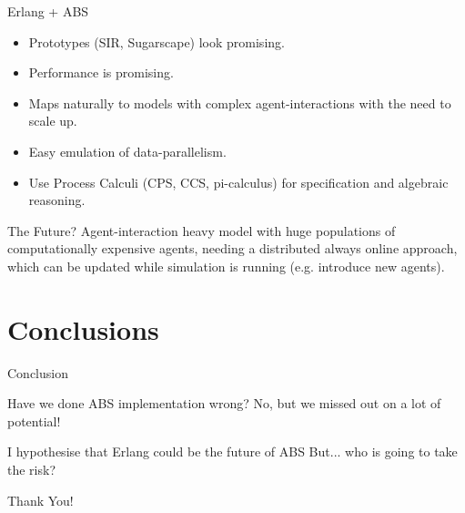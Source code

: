 \documentclass{beamer} %
\begin{document}
\begin{frame}{Erlang + ABS}
  \begin{itemize}
  	\item Prototypes (SIR, Sugarscape) look promising.
  	\item Performance is promising. %
    \item Maps naturally to models with complex agent-interactions with the need to scale up.
    \item Easy emulation of data-parallelism. %
    \item Use Process Calculi (CPS, CCS, pi-calculus) for specification and algebraic reasoning.
  \end{itemize}
  
  \begin{block}{The Future?}
Agent-interaction heavy model with huge populations of computationally expensive agents, needing a distributed always online approach, which can be updated while simulation is running (e.g. introduce new agents).
  \end{block}
\end{frame}

\section{Conclusions}

\begin{frame}{Conclusion}
\begin{block}{Have we done ABS implementation wrong?}
No, but we missed out on a lot of potential!
\end{block}

\begin{block}{I hypothesise that Erlang could be the future of ABS}
But... who is going to take the risk?
\end{block}
\end{frame}

\begin{frame}{}
  \begin{center}
  Thank You!
  \end{center}
\end{frame}



\end{document}
